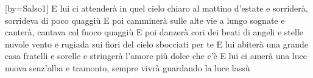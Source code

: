 [by={Salso1}]
\beginverse
E lui ci attenderà
in quel cielo chiaro al mattino d'estate
e sorriderà, sorrideva di poco quaggiù
E poi camminerà
sulle alte vie a lungo sognate
e canterà, cantava col fuoco quaggiù
\endverse
\beginchorus
E poi danzerà
cori dei beati di angeli e stelle
nuvole vento e rugiada
sui fiori del cielo sbocciati per te
\endchorus
\beginverse
E lui abiterà
una grande casa fratelli e sorelle
e stringerà l'amore più dolce che c'è
E lui ci amerà
una luce nuova senz'alba e tramonto,
sempre vivrà guardando la luce lassù
\endverse
\endsong
